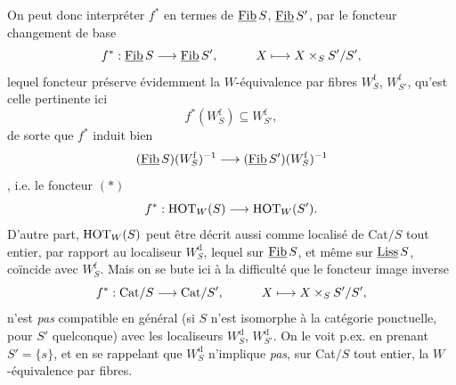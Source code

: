 On peut donc interpréter $f^*$ en termes de $\underline{\mathrm{Fib}}\, S$, $\underline{\mathrm{Fib}}\, S'$, par le foncteur changement de base
\[f^* : \underline{\mathrm{Fib}}\, S \longrightarrow \underline{\mathrm{Fib}}\, S', \qquad\quad X \longmapsto X \times_S S'/S',\]
lequel foncteur préserve évidemment la $W$-équivalence par fibres $W_S^{\mathrm{f}}$, $W_{S'}^{\mathrm{f}}$, qu'est celle pertinente ici
\[f^*(W_S^{\mathrm{f}}) \subseteq W_{S'}^{\mathrm{f}},\]
de sorte que $f^*$ induit bien
\[(\underline{\mathrm{Fib}}\, S)(W_S^{\mathrm{f}})^{-1} \longrightarrow (\underline{\mathrm{Fib}}\, S')(W_S^{\mathrm{f}})^{-1}\]
,
i.e. le foncteur $(*)$
\[f^* : \mathrm{HOT}_W(S) \longrightarrow \mathrm{HOT}_W(S').\]
D'autre part, $\mathrm{HOT}_W(S)$ peut être décrit aussi comme localisé de Cat$/S$ tout entier, par rapport au localiseur $W_S^{\mathrm{d}}$, lequel sur $\underline{\mathrm{Fib}}\, S$, et même sur $\underline{\mathrm{Liss}}\,S$, coïncide avec $W_S^{\mathrm{f}}$. Mais on se bute ici à la difficulté que le foncteur image inverse
\[f^* : \mathrm{Cat}/S \longrightarrow \mathrm{Cat}/S', \qquad\quad X \longmapsto X \times_S S'/S',\]
n'est \textit{pas} compatible en général (si $S$ n'est isomorphe à la catégorie ponctuelle, pour $S'$ quelconque) avec les localiseurs $W_S^{\mathrm{d}}$, $W_{S'}^{\mathrm{d}}$. On le voit p.ex. en prenant $S' = \{s\}$, et en se rappelant que $W_S^{\mathrm{d}}$ n'implique \textit{pas}, sur Cat$/S$ tout entier, la $W$-équivalence par fibres.

